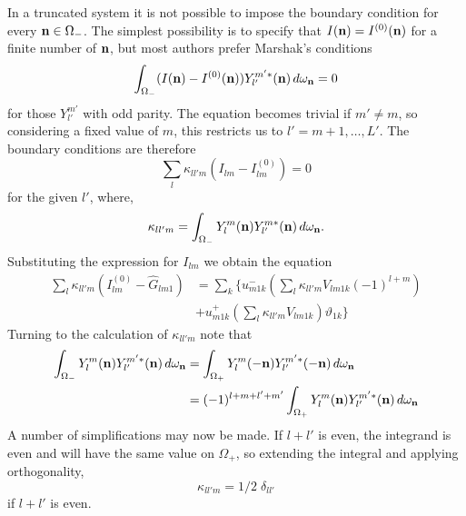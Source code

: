 In a truncated system it is not possible to impose the boundary condition
for every $\mathbf{n} \in \Omega_-$. The simplest possibility is to specify 
that $I(\mathbf{n})=I^{(0)}(\mathbf{n})$ for a finite number of
$\mathbf{n}$, but most authors prefer Marshak's conditions
\begin{equation}
\int_{\Omega_-} (I(\mathbf{n})-I^{(0)}(\mathbf{n})) Y_{l'}^{m'*} (\mathbf{n}) \, d \omega_{\mathbf{n}} =0
\end{equation}
for those $Y_{l'}^{m'}$ with odd parity. The equation becomes trivial if
$m' \neq m$, so considering a fixed value of $m$,
this restricts us to $l'=m+1, \ldots, L'$. The boundary conditions are
therefore
\begin{equation}
\sum_{l} \kappa_{ll'm}  (I_{lm}-I_{lm}^{(0)})=0
\end{equation}
for the given $l'$, where,
\begin{equation}
\kappa_{ll'm}=\int_{\Omega_-} Y_l^m(\mathbf{n}) Y_{l'}^{m*} (\mathbf{n}) \, d\omega_{\mathbf{n}}.
\end{equation}
Substituting the expression for $I_{lm}$ we obtain the equation
\begin{equation}
\begin{split}
\sum_l \kappa_{ll'm} (I_{lm}^{(0)}-\hat G_{lm1}) &=
\sum_k \Bigg \{ u_{m1k}^- \left ( \sum_l \kappa_{ll'm} V_{lm1k} (-1)^{l+m}
\right ) \\
&+ u_{m1k}^+ \left ( \sum_l \kappa_{ll'm} V_{lm1k}
\right ) \vartheta_{1k} \Bigg \}
\end{split}
\end{equation}
Turning to the calculation of $\kappa_{ll'm}$ note that
\begin{equation}
\begin{split}
\int_{\Omega_-} Y_l^m(\mathbf{n}) Y_{l'}^{m'*} (\mathbf{n}) \, d\omega_{\mathbf{n}}
&= \int_{\Omega_+} Y_l^m(-\mathbf{n}) Y_{l'}^{m'*} (-\mathbf{n}) \, d\omega_{\mathbf{n}} \\
&= (-1)^{l+m+l'+m'} \int_{\Omega_+} Y_l^m(\mathbf{n}) Y_{l'}^{m'*} (\mathbf{n}) 
\, d\omega_{\mathbf{n}} 
\end{split}
\end{equation}
A number of simplifications may now be made. If $l+l'$ is even, the integrand
is even and will have the same value on $\Omega_+$, so extending the integral
and applying orthogonality,
\begin{equation}
\kappa_{ll'm}= 1/2 \; \delta_{ll'}
\end{equation}
if $l+l'$ is even.

